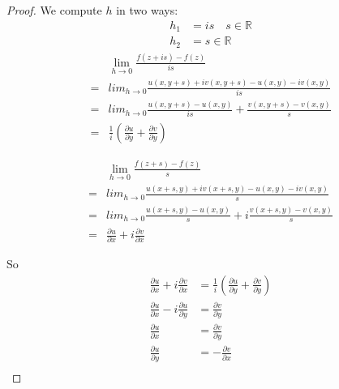 \begin{proof}
    We compute $h$ in two ways:
    \begin{align*}
        h_1 & = is \quad s \in \mathbb{R} \\
        h_2 & = s \in \mathbb{R}
    \end{align*}
    \begin{align*}
          & \lim_{h\to 0}\frac{f(z + is) - f(z)}{is}                                       \\
        = & lim_{h\to 0}\frac{u(x, y + s) + iv(x, y + s) - u(x, y) - iv(x, y)}{is}         \\
        = & lim_{h\to 0}\frac{u(x, y + s) - u(x, y)}{is} + \frac{v(x, y + s) - v(x, y)}{s} \\
        = & \frac{1}{i}(\frac{\partial u}{\partial y} + \frac{\partial v}{\partial y})
    \end{align*}

    \begin{align*}
          & \lim_{h\to 0}\frac{f(z + s) - f(z)}{s}                                         \\
        = & lim_{h\to 0}\frac{u(x + s, y) + iv(x + s, y) - u(x, y) - iv(x, y)}{s}          \\
        = & lim_{h\to 0}\frac{u(x + s, y) - u(x, y)}{s} + i\frac{v(x + s, y) - v(x, y)}{s} \\
        = & \frac{\partial u}{\partial x} + i\frac{\partial v}{\partial x}
    \end{align*}

    So
    \begin{align*}
        \frac{\partial u}{\partial x} + i\frac{\partial v}{\partial x} & = \frac{1}{i}(\frac{\partial u}{\partial y} + \frac{\partial v}{\partial y}) \\
        \frac{\partial u}{\partial x} - i\frac{\partial u}{\partial y} & = \frac{\partial v}{\partial y}                                              \\
        \frac{\partial u}{\partial x}                                  & = \frac{\partial v}{\partial y}                                              \\
        \frac{\partial u}{\partial y}                                  & = -\frac{\partial v}{\partial x}                                             \\
    \end{align*}


\end{proof}

